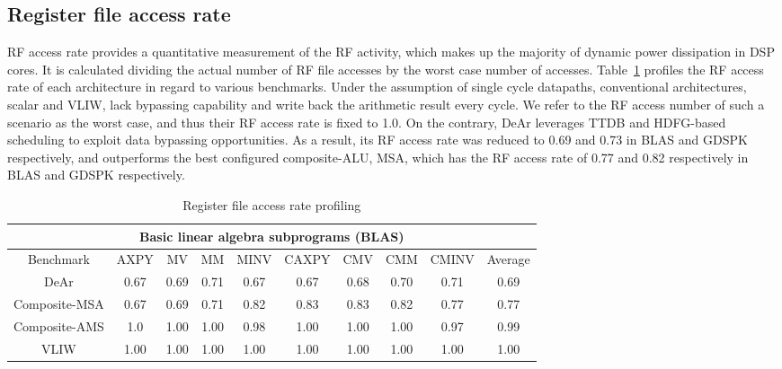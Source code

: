 {    \subsection{Register file access rate}
    RF access rate provides a quantitative measurement of the RF activity, 
    which makes up the majority of dynamic power dissipation in DSP cores.
    It is calculated dividing the actual number of RF file accesses by the worst case number of accesses.
    Table~\ref{tab:rpd} profiles the RF access rate of each architecture in regard to various benchmarks.
    Under the assumption of single cycle datapaths, conventional architectures, scalar and VLIW, 
    lack bypassing capability and write back the arithmetic result every cycle.
    We refer to the RF access number of such a scenario as the worst case, 
    and thus their RF access rate is fixed to 1.0.
    On the contrary, DeAr leverages TTDB and HDFG-based scheduling to exploit data bypassing opportunities. 
    As a result, its RF access rate was reduced to 0.69 and 0.73 in BLAS and GDSPK respectively, 
    and outperforms the best configured composite-ALU, MSA, which has the RF access rate of 0.77 and 0.82 respectively in BLAS and GDSPK respectively.
    \begin{table}[!ht]
        \centering
        \caption{Register file access rate profiling}
        \label{tab:rpd}
        \resizebox{\columnwidth}{!}
        {
            \begin{tabular}{|c|c|c|c|c|c|c|c|c|c|}
                \hline
                \multicolumn{10}{|c|}{\textbf{Basic linear algebra subprograms (BLAS)}} \\ \hline
                Benchmark  &  AXPY  &  MV  &  MM  &  MINV  &  CAXPY  &  CMV  &  CMM  &  CMINV  &  Average \\ \hline 
                DeAr  &   0.67  &   0.69  &   0.71  &   0.67  &   0.67  &   0.68  &   0.70  &   0.71  &   0.69     \\ \hline
                Composite-MSA  &   0.67  &   0.69  &  0.71  &   0.82  &   0.83  &   0.83  &   0.82  &   0.77  &  0.77     \\ \hline 
                Composite-AMS  &   1.0  &   1.00  &   1.00  &   0.98  &   1.00  &   1.00  &   1.00  &   0.97  &   0.99     \\ \hline 
                VLIW  &   1.00  &   1.00  &   1.00  &   1.00  &   1.00  &   1.00  &   1.00  &   1.00  &   1.00     \\ \hline 

\end{tabular}}
\end{table}}
